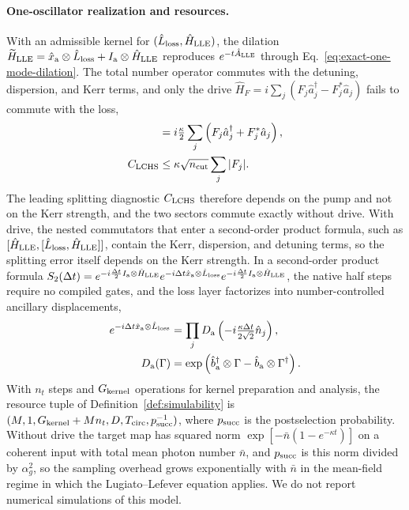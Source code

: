 \documentclass[pra,twocolumn,superscriptaddress,nofootinbib,floatfix]{revtex4-2}
\theoremstyle{remark}
\newcommand{\revcolor}{\color{blue}}
\DeclareRobustCommand{\rev}[1]{{\revcolor #1}}
\begin{document}
\paragraph{\rev{One-oscillator realization and resources.}}
\rev{With an admissible kernel for \((\hat L_{\rm loss},\hat H_{\rm LLE})\), the dilation \(\widetilde H_{\rm LLE}=\hat x_{\rm a}\otimes\hat L_{\rm loss}+I_{\rm a}\otimes\hat H_{\rm LLE}\) reproduces \(e^{-t\hat A_{\rm LLE}}\) through Eq.~\eqref{eq:exact-one-mode-dilation}.} \rev{The total number operator commutes with the detuning, dispersion, and Kerr terms, and only the drive \(\hat H_F=i\sum_j(F_j\hat a_j^\dagger-F_j^*\hat a_j)\) fails to commute with the loss,}
\begingroup\revcolor
\begin{align}
[\hat L_{\rm loss},\hat H_{\rm LLE}]&=i\tfrac{\kappa}{2}\sum_j\left(F_j\hat a_j^\dagger+F_j^*\hat a_j\right),\nonumber\\
C_{\rm LCHS}&\le\kappa\sqrt{n_{\rm cut}}\sum_j|F_j| .
\end{align}
\endgroup
\rev{The leading splitting diagnostic \(C_{\rm LCHS}\) therefore depends on the pump and not on the Kerr strength, and the two sectors commute exactly without drive.} \rev{With drive, the nested commutators that enter a second-order product formula, such as \([\hat H_{\rm LLE},[\hat L_{\rm loss},\hat H_{\rm LLE}]]\), contain the Kerr, dispersion, and detuning terms, so the splitting error itself depends on the Kerr strength.} \rev{In a second-order product formula \(S_2(\Delta t)=e^{-i\frac{\Delta t}{2}I_{\rm a}\otimes\hat H_{\rm LLE}}e^{-i\Delta t\hat x_{\rm a}\otimes\hat L_{\rm loss}}e^{-i\frac{\Delta t}{2}I_{\rm a}\otimes\hat H_{\rm LLE}}\), the native half steps require no compiled gates, and the loss layer factorizes into number-controlled ancillary displacements,}
\begingroup\revcolor
\begin{align}
e^{-i\Delta t\hat x_{\rm a}\otimes\hat L_{\rm loss}}&=\prod_{j}D_{\rm a}\left(-i\tfrac{\kappa\Delta t}{2\sqrt2}\hat n_j\right),\nonumber\\
D_{\rm a}(\Gamma)&=\exp\left(\hat b_{\rm a}^\dagger\otimes\Gamma-\hat b_{\rm a}\otimes\Gamma^\dagger\right).
\end{align}
\endgroup
\rev{With \(n_t\) steps and \(G_{\rm kernel}\) operations for kernel preparation and analysis, the resource tuple of Definition~\ref{def:simulability} is \((M,1,G_{\rm kernel}+Mn_t,D,T_{\rm circ},p_{\rm succ}^{-1})\), where \(p_{\rm succ}\) is the postselection probability.} \rev{Without drive the target map has squared norm \(\exp[-\bar n(1-e^{-\kappa t})]\) on a coherent input with total mean photon number \(\bar n\), and \(p_{\rm succ}\) is this norm divided by \(\alpha_g^2\), so the sampling overhead grows exponentially with \(\bar n\) in the mean-field regime in which the Lugiato--Lefever equation applies.} \rev{We do not report numerical simulations of this model.}
\end{document}
